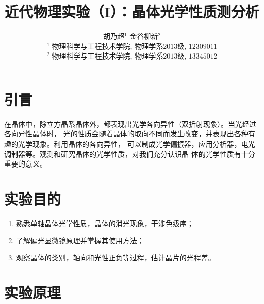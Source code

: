 \documentclass[11pt,a4paper]{article}
\title{近代物理实验（I）：晶体光学性质测分析}
\author{胡乃超$^1$ \hspace{1cm}  金谷柳新$^2$\\
\footnotesize{ $^1$ 物理科学与工程技术学院, 物理学系$2013$级, $12309011$} \\
\footnotesize{ $^2$ 物理科学与工程技术学院, 物理学系$2013$级, $13345012$}}
\date{}
\begin{document}
\begin{spacing}{1.3}
\begin{CJK*}{UTF8}{gbsn}
\maketitle
\section{引言}
在晶体中，除立方晶系晶体外，都表现出光学各向异性（双折射现象）。当光经过各向异性晶体时，
光的性质会随着晶体的取向不同而发生改变，并表现出各种有趣的光学现象。利用晶体的各向异性，
可以制成光学偏振器，应用分析器，电光调制器等。观测和研究晶体的光学性质，对我们充分认识晶
体的光学性质有十分重要的意义。
\section{实验目的}
\begin{enumerate}
\item 	熟悉单轴晶体光学性质，晶体的消光现象，干涉色级序；
\item   了解偏光显微镜原理并掌握其使用方法；
\item   观察晶体的类别，轴向和光性正负等过程，估计晶片的光程差。
\end{enumerate}

\section{实验原理}

\end{CJK*}
\end{spacing}
\end{document}
